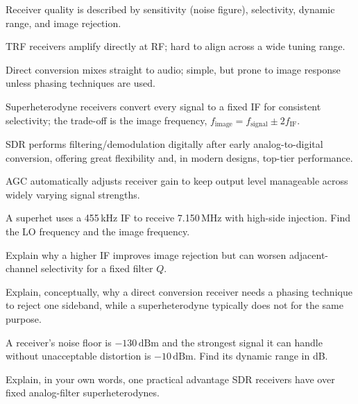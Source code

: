 \begin{quickreview}
\item Receiver quality is described by sensitivity (noise figure),
selectivity, dynamic range, and image rejection.
\item TRF receivers amplify directly at RF; hard to align across a wide
tuning range.
\item Direct conversion mixes straight to audio; simple, but prone to
image response unless phasing techniques are used.
\item Superheterodyne receivers convert every signal to a fixed IF for
consistent selectivity; the trade-off is the image frequency,
$f_{\text{image}} = f_{\text{signal}} \pm 2f_{\text{IF}}$.
\item SDR performs filtering/demodulation digitally after early
analog-to-digital conversion, offering great flexibility and, in modern
designs, top-tier performance.
\item AGC automatically adjusts receiver gain to keep output level
manageable across widely varying signal strengths.
\end{quickreview}

\begin{practiceproblems}
\item A superhet uses a 455\,kHz IF to receive 7.150\,MHz with high-side
injection. Find the LO frequency and the image frequency.
\item Explain why a higher IF improves image rejection but can worsen
adjacent-channel selectivity for a fixed filter $Q$.
\item Explain, conceptually, why a direct conversion receiver needs a
phasing technique to reject one sideband, while a superheterodyne
typically does not for the same purpose.
\item A receiver's noise floor is $-130\,\text{dBm}$ and the strongest
signal it can handle without unacceptable distortion is $-10\,\text{dBm}$.
Find its dynamic range in dB.
\item Explain, in your own words, one practical advantage SDR receivers
have over fixed analog-filter superheterodynes.
\end{practiceproblems}
